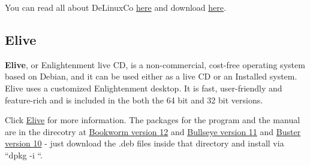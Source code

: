 You can read all about DeLinuxCo \href{https://www.delinuxco.com/}{here} and download \href{https://www.delinuxco.com/download/}{here}.

\subsection{Elive}
\label{sec:elive}

\textbf{Elive}, or Enlightenment live CD, is a non-commercial, cost-free operating system based on Debian, and it can be used either as a live CD or an Installed system. Elive uses a customized Enlightenment desktop. It is fast, user-friendly and feature-rich and \CGG{} is included in the both the 64 bit and 32 bit versions.

Click \href{https://www.elivecd.org/}{Elive} for more information.  The \CGG{} packages for the program
and the manual are in the direcotry at 
\href{https://repo.bookworm.elive.elivecd.org/pool/multimedia/c/} {Bookworm version 12} and
\href{https://repo.bullseye.elive.elivecd.org/pool/multimedia/c/} {Bullseye version 11} and
\href{http://repo.buster.elive.elivecd.org/pool/multimedia/c/}{Buster version 10} - just download 
the .deb files inside that directory and install via “dpkg -i “.

